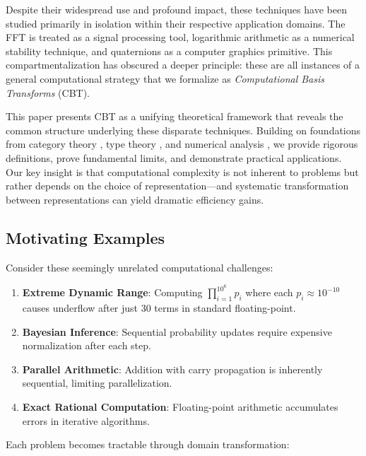 \documentclass[11pt]{article}
\theoremstyle{definition}
\begin{document}
Despite their widespread use and profound impact, these techniques have been studied primarily in isolation within their respective application domains. The FFT is treated as a signal processing tool, logarithmic arithmetic as a numerical stability technique, and quaternions as a computer graphics primitive. This compartmentalization has obscured a deeper principle: these are all instances of a general computational strategy that we formalize as \emph{Computational Basis Transforms} (CBT).

This paper presents CBT as a unifying theoretical framework that reveals the common structure underlying these disparate techniques. Building on foundations from category theory \cite{awodey2010category}, type theory \cite{bird1997algebra}, and numerical analysis \cite{higham2002accuracy}, we provide rigorous definitions, prove fundamental limits, and demonstrate practical applications. Our key insight is that computational complexity is not inherent to problems but rather depends on the choice of representation—and systematic transformation between representations can yield dramatic efficiency gains.

\subsection{Motivating Examples}

Consider these seemingly unrelated computational challenges:

\begin{enumerate}
\item \textbf{Extreme Dynamic Range}: Computing $\prod_{i=1}^{10^6} p_i$ where each $p_i \approx 10^{-10}$ causes underflow after just 30 terms in standard floating-point.

\item \textbf{Bayesian Inference}: Sequential probability updates require expensive normalization after each step.

\item \textbf{Parallel Arithmetic}: Addition with carry propagation is inherently sequential, limiting parallelization.

\item \textbf{Exact Rational Computation}: Floating-point arithmetic accumulates errors in iterative algorithms.
\end{enumerate}

Each problem becomes tractable through domain transformation:
\end{document}
